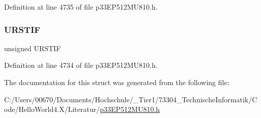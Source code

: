 Definition at line 4735 of file p33\+E\+P512\+M\+U810.\+h.

\mbox{\label{structtag_u1_i_r_b_i_t_s_a98694065ad0c4f90e15ef7d41671583b}} 
\subsubsection{\texorpdfstring{U\+R\+S\+T\+IF}{URSTIF}}
{\footnotesize\ttfamily unsigned U\+R\+S\+T\+IF}



Definition at line 4734 of file p33\+E\+P512\+M\+U810.\+h.



The documentation for this struct was generated from the following file\+:\begin{DoxyCompactItemize}
\item 
C\+:/\+Users/00670/\+Documents/\+Hochschule/\+\_\+\+Tier1/73304\+\_\+\+Technische\+Informatik/\+Code/\+Hello\+World4.\+X/\+Literatur/\hyperlink{p33_e_p512_m_u810_8h}{p33\+E\+P512\+M\+U810.\+h}\end{DoxyCompactItemize}
